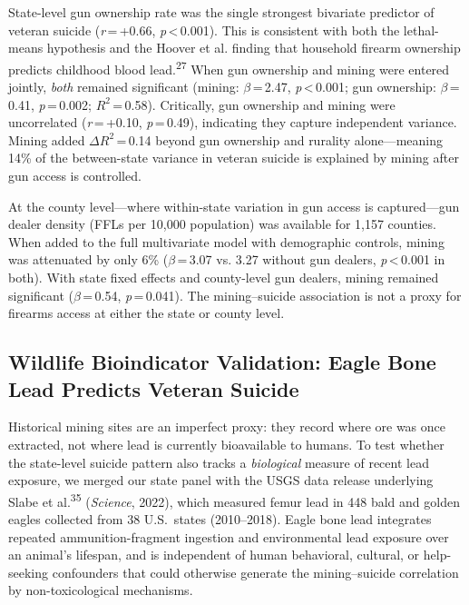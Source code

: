 \documentclass[11pt,twocolumn]{article}
\begin{document}
State-level gun ownership rate was the single strongest bivariate predictor of veteran suicide (\textit{r}\,=\,+0.66, \textit{p}\,<\,0.001). This is consistent with both the lethal-means hypothesis and the Hoover et al. finding that household firearm ownership predicts childhood blood lead.\textsuperscript{27} When gun ownership and mining were entered jointly, \textit{both} remained significant (mining: $\beta$\,=\,2.47, \textit{p}\,<\,0.001; gun ownership: $\beta$\,=\,0.41, \textit{p}\,=\,0.002; $R^2$\,=\,0.58). Critically, gun ownership and mining were uncorrelated (\textit{r}\,=\,+0.10, \textit{p}\,=\,0.49), indicating they capture independent variance. Mining added $\Delta R^2$\,=\,0.14 beyond gun ownership and rurality alone---meaning 14\% of the between-state variance in veteran suicide is explained by mining after gun access is controlled.

At the county level---where within-state variation in gun access is captured---gun dealer density (FFLs per 10,000 population) was available for 1,157 counties. When added to the full multivariate model with demographic controls, mining was attenuated by only 6\% ($\beta$\,=\,3.07 vs. 3.27 without gun dealers, \textit{p}\,<\,0.001 in both). With state fixed effects and county-level gun dealers, mining remained significant ($\beta$\,=\,0.54, \textit{p}\,=\,0.041). The mining--suicide association is not a proxy for firearms access at either the state or county level.


\subsection{Wildlife Bioindicator Validation: Eagle Bone Lead Predicts Veteran Suicide}

Historical mining sites are an imperfect proxy: they record where ore was once extracted, not where lead is currently bioavailable to humans. To test whether the state-level suicide pattern also tracks a \textit{biological} measure of recent lead exposure, we merged our state panel with the USGS data release underlying Slabe et al.\textsuperscript{35} (\textit{Science}, 2022), which measured femur lead in 448 bald and golden eagles collected from 38 U.S.\ states (2010--2018). Eagle bone lead integrates repeated ammunition-fragment ingestion and environmental lead exposure over an animal's lifespan, and is independent of human behavioral, cultural, or help-seeking confounders that could otherwise generate the mining--suicide correlation by non-toxicological mechanisms.
\end{document}
